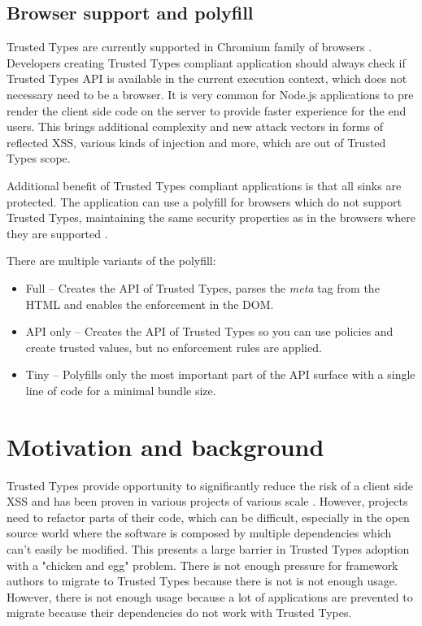\subsection{Browser support and polyfill}

Trusted Types are currently supported in Chromium family of browsers \cite{mdn:tt_compatibility}.
Developers creating Trusted Types compliant application should always check if Trusted Types API is
available in the current execution context, which does not necessary need to be a browser. It is
very common for Node.js applications to pre render the client side code on the server to provide
faster experience for the end users. This brings additional complexity and new attack vectors in
forms of reflected XSS, various kinds of injection and more, which are out of Trusted Types scope.

Additional benefit of Trusted Types compliant applications is that all sinks are protected. The
application can use a polyfill for browsers which do not support Trusted Types, maintaining the same
security properties as in the browsers where they are supported \cite{xss_nowhere_with_polyfill}.

There are multiple variants of the polyfill:

\begin{itemize}
  \item Full -- Creates the API of Trusted Types, parses the \emph{meta} tag from the HTML and
        enables the enforcement in the DOM.
  \item API only -- Creates the API of Trusted Types so you can use policies and create trusted
        values, but no enforcement rules are applied.
  \item Tiny -- Polyfills only the most important part of the API surface with a single line of code
        for a minimal bundle size.
\end{itemize}

\section{Motivation and background}

Trusted Types provide opportunity to significantly reduce the risk of a client side XSS and has been
proven in various projects of various scale \cite{tt_web_framework_paper}
\cite{tt_integration_list}. However, projects need to refactor parts of their code, which can be
difficult, especially in the open source world where the software is composed by multiple
dependencies which can't easily be modified. This presents a large barrier in Trusted Types adoption
\cite{tt_web_framework_paper} with a "chicken and egg" problem. There is not enough pressure for
framework authors to migrate to Trusted Types because there is not is not enough usage. However,
there is not enough usage because a lot of applications are prevented to migrate because their
dependencies do not work with Trusted Types.

